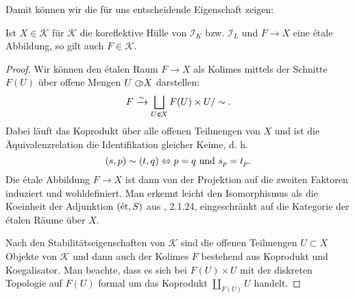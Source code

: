 Damit können wir die für uns entscheidende Eigenschaft zeigen:
\begin{prop}
  Ist $X \in \mathcal{K}$ für $\mathcal{K}$ die koreflektive Hülle von
  $\mathcal{I}_K$ bzw. $\mathcal{I}_L$ und $F \to X$ eine étale
  Abbildung, so gilt auch $F \in \mathcal{K}$.
\end{prop}
\begin{proof}
  Wir können den étalen Raum $F \to X$ als Kolimes mittels der
  Schnitte $F(U)$ über offene Mengen $U \subset\kern-0.58em\circ X$ darstellen:
  \[ F \xrightarrow[]{\sim} \bigsqcup_{U \subset\kern-0.58em\circ X} F(U) \times U / \sim. \]
  Dabei läuft das Koprodukt über alle offenen Teilmengen von $X$ und
  ist die Äquivalenzrelation die Identifikation gleicher Keime, d. h.
  \[ (s, p) \sim (t, q) \Leftrightarrow p = q \text{ und } s_p = t_p. \]
  Die étale Abbildung $F \to X$ ist dann von der Projektion auf die
  zweiten Faktoren induziert und wohldefiniert. Man erkennt leicht den
  Isomorphismus als die Koeinheit der Adjunktion $(\mathrm{\acute{e}t}, S)$ aus
  \cite{TG}, 2.1.24, eingeschränkt auf die Kategorie der étalen Räume
  über $X$.

  Nach den Stabilitätseigenschaften von $\mathcal{K}$ sind die offenen
  Teilmengen $U \subset X$ Objekte von $\mathcal{K}$ und dann auch der
  Kolimes $F$ bestehend aus Koprodukt und Koegalisator. Man beachte,
  dass es sich bei $F(U) \times U$ mit der diskreten Topologie auf
  $F(U)$ formal um das Koprodukt $\coprod_{F(U)} U$ handelt.
\end{proof}

